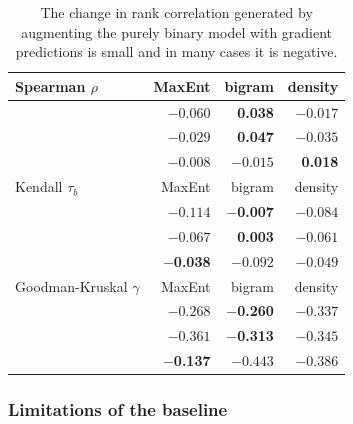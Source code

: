 \begin{table} \label{controlled}
\centering
\begin{tabular}{l r r r}
\toprule
Spearman $\rho$          & MaxEnt            & bigram            & density  \\
\midrule
\citealt{Greenberg1964}  & $-0.060$          &  \textbf{0.038} & $-0.017$ \\
\citealt{Scholes1966}    & $-0.029$          &  \textbf{0.047} & $-0.035$ \\
\citealt{Albright2003b}  & $-0.008$          & $-0.015$          & \textbf{0.018} \\
\midrule
Kendall $\tau_b$         & MaxEnt            & bigram            & density  \\
\midrule
\citealt{Greenberg1964}  & $-0.114$          & \textbf{$-$0.007} & $-0.084$ \\
\citealt{Scholes1966}    & $-0.067$          & \textbf{0.003}  & $-0.061$ \\
\citealt{Albright2003b}  & \textbf{$-$0.038} & $-0.092$          & $-0.049$ \\
\midrule
Goodman-Kruskal $\gamma$ & MaxEnt            & bigram            & density  \\
\midrule
\citealt{Greenberg1964}  & $-0.268$          & \textbf{$-$0.260} & $-0.337$ \\
\citealt{Scholes1966}    & $-0.361$          & \textbf{$-$0.313} & $-0.345$ \\
\citealt{Albright2003b}  & \textbf{$-$0.137} & $-0.443$          & $-0.386$ \\
\bottomrule
\end{tabular}
\caption{The change in rank correlation generated by augmenting the purely binary model with gradient predictions is small and in many cases it is negative.}
\end{table}

\subsubsection{Limitations of the baseline}
\label{limitations}

